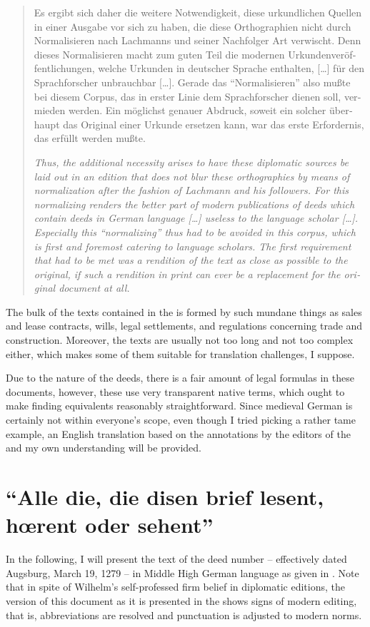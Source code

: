 \documentclass[12pt,paper=a4]{scrartcl}
\begin{document}
\foreignblockquote{german}{\begin{multicols}{2}Es ergibt sich daher die weitere Notwendigkeit, diese urkundlichen Quellen in einer Ausgabe vor sich zu haben, die diese Orthographien nicht durch Normalisieren nach Lachmanns und seiner Nachfolger Art verwischt. Denn dieses Normalisieren macht zum guten Teil die modernen Urkundenveröffentlichungen, welche Urkunden in deutscher Sprache enthalten, […] für den Sprachforscher unbrauchbar […]. Gerade das \enquote{Normalisieren} also mußte bei diesem Corpus, das in erster Linie dem Sprachforscher dienen soll, vermieden werden. Ein möglichst genauer Abdruck, soweit ein solcher überhaupt das Original einer Urkunde ersetzen kann, war das erste Erfordernis, das erfüllt werden mußte. \autocite[LX]{CAO1}

\columnbreak

{\itshape Thus, the additional necessity arises to have these diplomatic sources be laid out in an edition that does not blur these orthographies by means of normalization after the fashion of Lachmann and his followers. For this normalizing renders the better part of modern publications of deeds which contain deeds in German language […] useless to the language scholar […]. Especially this \enquote{normalizing} thus had to be avoided in this corpus, which is first and foremost catering to language scholars. The first requirement that had to be met was a rendition of the text as close as possible to the original, if such a rendition in print can ever be a replacement for the original document at all.}\end{multicols}}

The bulk of the texts contained in the  is formed by such mundane things as sales and lease contracts, wills, legal settlements, and regulations concerning trade and construction. Moreover, the texts are usually not too long and not too complex either, which makes some of them suitable for translation challenges, I suppose.

Due to the nature of the deeds, there is a fair amount of legal formulas in these documents, however, these use very transparent native terms, which ought to make finding equivalents reasonably straightforward. Since medieval German is certainly not within everyone's scope, even though I tried picking a rather tame example, an English translation based on the annotations by the editors of the  and my own understanding will be provided.

\section{\enquote{Alle die, die disen brief lesent, hœrent oder sehent}}
In the following, I will present the text of the deed number  -- effectively dated Augsburg, March 19, 1279 -- in Middle High German language as given in \textcite{n163}. Note that in spite of Wilhelm's self-professed firm belief in diplomatic editions, the version of this document as it is presented in the  shows signs of modern editing, that is, abbreviations are resolved and punctuation is adjusted to modern norms.
\end{document}
